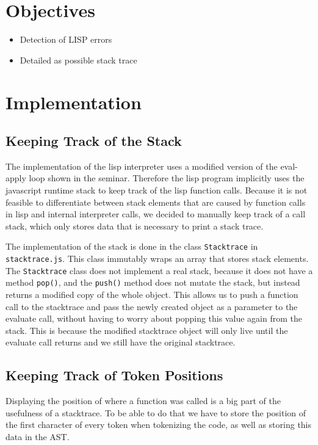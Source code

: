 \documentclass[a4paper,titlepage]{article}
\numberwithin{equation}{section} %
\begin{document}
	
	
	\section{Objectives}
	\begin{itemize}
		\item Detection of LISP errors
		\item Detailed as possible stack trace
	\end{itemize}
	\newpage
	
	
	\section{Implementation}
	\subsection{Keeping Track of the Stack}
	
	The implementation of the lisp interpreter uses a modified version of the eval-apply loop shown in the seminar. Therefore the lisp program implicitly uses the javascript runtime stack to keep track of the lisp function calls. Because it is not feasible to differentiate between stack elements that are caused by function calls in lisp and internal interpreter  calls, we decided to manually keep track of a call stack, which only stores data that is necessary to print a stack trace.
	
	The implementation of the stack is done in the class \texttt{Stacktrace} in \texttt{stacktrace.js}. This class immutably wraps an array that stores stack elements. The \texttt{Stacktrace} class does not implement a real stack, because it does not have a method \texttt{pop()}, and the \texttt{push()} method does not mutate the stack, but instead returns a modified copy of the whole object.
	This allows us to push a function call to the stacktrace and pass the newly created object as a parameter to the evaluate call, without having to worry about popping this value again from the stack. This is because the modified stacktrace object will only live until the evaluate call returns and we still have the original stacktrace.
	
	\subsection{Keeping Track of Token Positions}
	\label{sub-token-pos}
	Displaying the position of where a function was called is a big part of the usefulness of a stacktrace. To be able to do that we have to store the position of the first character of every token when tokenizing the code, as well as storing this data in the AST.
	
\end{document}

